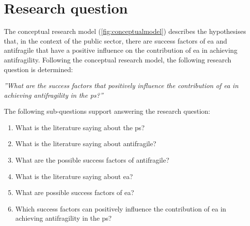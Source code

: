 \section{Research question}
\label{sec:introresearchquestion}
 The conceptual research model (\cref{fig:conceptualmodel}) describes the hypothesises that, in the context of the public sector, there are success factors of \acrshort{ea} and \gls{antifragile} that have a positive influence on the contribution of \acrlong{ea} in achieving \gls{antifragility}. Following the conceptual research model, the following research question is determined:\bigskip

\noindent \emph{''What are the success factors that positively influence the contribution of \acrlong{ea} in achieving \gls{antifragility} in the \gls{ps}?''}\bigskip

\noindent The following sub-questions support answering the research question:

\begin{enumerate}
	\item{What is the literature saying about the \gls{ps}?}
	\item{What is the literature saying about \gls{antifragile}?}
	\item{What are the possible success factors of \gls{antifragile}?}
	\item{What is the literature saying about \acrlong{ea}?}
	\item{What are possible success factors of \acrlong{ea}?}
	\item{Which success factors can positively influence the contribution of \acrlong{ea} in achieving \gls{antifragility} in the \gls{ps}?}
\end{enumerate}
